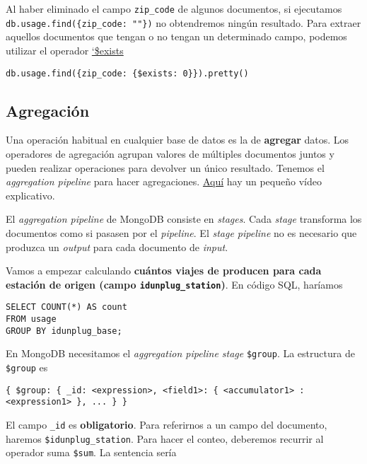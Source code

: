 \documentclass[]{article}
\begin{document}
Al haber eliminado el campo \texttt{zip\_code} de algunos documentos, si
ejecutamos \texttt{db.usage.find(\{zip\_code:\ ""\})} no obtendremos
ningún resultado. Para extraer aquellos documentos que tengan o no
tengan un determinado campo, podemos utilizar el operador
\href{https://docs.mongodb.com/manual/reference/operator/query/exists/}{`\$exists}

\begin{verbatim}
db.usage.find({zip_code: {$exists: 0}}).pretty()
\end{verbatim}

\hypertarget{agregacion}{%
\subsection{Agregación}\label{agregacion}}

Una operación habitual en cualquier base de datos es la de
\textbf{agregar} datos. Los operadores de agregación agrupan valores de
múltiples documentos juntos y pueden realizar operaciones para devolver
un único resultado. Tenemos el \emph{aggregation pipeline} para hacer
agregaciones.
\href{https://docs.mongodb.com/manual/core/aggregation-pipeline/}{Aquí}
hay un pequeño vídeo explicativo.

El \emph{aggregation pipeline} de MongoDB consiste en \emph{stages}.
Cada \emph{stage} transforma los documentos como si pasasen por el
\emph{pipeline}. El \emph{stage pipeline} no es necesario que produzca
un \emph{output} para cada documento de \emph{input}.

Vamos a empezar calculando \textbf{cuántos viajes de producen para cada
estación de origen (campo \texttt{idunplug\_station})}. En código SQL,
haríamos

\begin{verbatim}
SELECT COUNT(*) AS count
FROM usage
GROUP BY idunplug_base;
\end{verbatim}

En MongoDB necesitamos el \emph{aggregation pipeline stage}
\texttt{\$group}. La estructura de \texttt{\$group} es

\begin{verbatim}
{ $group: { _id: <expression>, <field1>: { <accumulator1> : <expression1> }, ... } }
\end{verbatim}

El campo \texttt{\_id} es \textbf{obligatorio}. Para referirnos a un
campo del documento, haremos \texttt{\$idunplug\_station}. Para hacer el
conteo, deberemos recurrir al operador suma \texttt{\$sum}. La sentencia
sería
\end{document}
